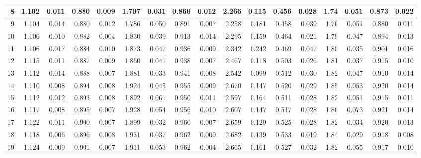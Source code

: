 \documentclass[
]{article}
\begin{document}
\begin{table}[H]
{\begin{tabular}[t]{r|r|r|r|r|r|r|r|r|r|r|r|r|r|r|r|r}
\hline
\hspace{1em}8 & 1.102 & 0.011 & 0.880 & 0.009 & 1.707 & 0.031 & 0.860 & 0.012 & 2.266 & 0.115 & 0.456 & 0.028 & 1.74 & 0.051 & 0.873 & 0.022\\
\hline
\hspace{1em}9 & 1.104 & 0.014 & 0.880 & 0.012 & 1.786 & 0.050 & 0.891 & 0.007 & 2.258 & 0.181 & 0.458 & 0.039 & 1.76 & 0.051 & 0.880 & 0.011\\
\hline
\hspace{1em}10 & 1.106 & 0.010 & 0.882 & 0.004 & 1.830 & 0.039 & 0.913 & 0.014 & 2.295 & 0.159 & 0.464 & 0.021 & 1.79 & 0.047 & 0.894 & 0.013\\
\hline
\hspace{1em}11 & 1.106 & 0.017 & 0.884 & 0.010 & 1.873 & 0.047 & 0.936 & 0.009 & 2.342 & 0.242 & 0.469 & 0.047 & 1.80 & 0.035 & 0.901 & 0.016\\
\hline
\hspace{1em}12 & 1.115 & 0.011 & 0.887 & 0.009 & 1.860 & 0.041 & 0.938 & 0.007 & 2.467 & 0.118 & 0.503 & 0.026 & 1.81 & 0.037 & 0.915 & 0.010\\
\hline
\hspace{1em}13 & 1.112 & 0.014 & 0.888 & 0.007 & 1.881 & 0.033 & 0.941 & 0.008 & 2.542 & 0.099 & 0.512 & 0.030 & 1.82 & 0.047 & 0.910 & 0.014\\
\hline
\hspace{1em}14 & 1.110 & 0.008 & 0.894 & 0.008 & 1.924 & 0.045 & 0.955 & 0.009 & 2.670 & 0.147 & 0.520 & 0.029 & 1.85 & 0.053 & 0.920 & 0.014\\
\hline
\hspace{1em}15 & 1.112 & 0.012 & 0.893 & 0.008 & 1.892 & 0.061 & 0.950 & 0.011 & 2.597 & 0.164 & 0.511 & 0.028 & 1.82 & 0.051 & 0.915 & 0.011\\
\hline
\hspace{1em}16 & 1.117 & 0.008 & 0.895 & 0.007 & 1.928 & 0.054 & 0.956 & 0.010 & 2.607 & 0.147 & 0.517 & 0.028 & 1.86 & 0.073 & 0.921 & 0.014\\
\hline
\hspace{1em}17 & 1.122 & 0.011 & 0.900 & 0.007 & 1.899 & 0.032 & 0.960 & 0.007 & 2.659 & 0.129 & 0.525 & 0.028 & 1.82 & 0.034 & 0.920 & 0.013\\
\hline
\hspace{1em}18 & 1.118 & 0.006 & 0.896 & 0.008 & 1.931 & 0.037 & 0.962 & 0.009 & 2.682 & 0.139 & 0.533 & 0.019 & 1.84 & 0.029 & 0.918 & 0.008\\
\hline
\hspace{1em}19 & 1.124 & 0.009 & 0.901 & 0.007 & 1.911 & 0.053 & 0.962 & 0.004 & 2.665 & 0.161 & 0.527 & 0.032 & 1.82 & 0.055 & 0.917 & 0.010\\

\end{tabular}}
\end{table}
\end{document}
